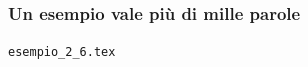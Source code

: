 \documentclass[svgnames,%
	ucs,%
	pdftex]{guitbeamer}
\begin{document}
\begin{frame}
  \frametitle{Un esempio vale pi\`u di mille parole}
	\begin{center}
		\alert{\texttt{esempio\_2\_6.tex}}
	\end{center}
\end{frame}
\end{document}
